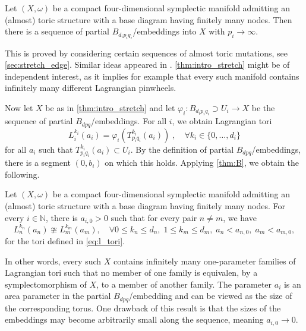 \documentclass[12pt,a4paper,abstract=true,final]{scrartcl}
\begin{document}
\begin{proposition}
    \label{thm:intro_stretch}
  Let $(X,\omega)$ be a compact four-dimensional symplectic manifold admitting an (almost) toric structure with a base diagram having finitely many nodes.
Then there is a sequence of partial $B_{d_i p_i q_i}$\-/embeddings into $X$ with $p_i \rightarrow \infty$. 
\end{proposition}

This is proved by considering certain sequences of almost toric mutations, see \cref{sec:stretch_edge}.
Similar ideas appeared in \cite{EvaUrz21}.
\cref{thm:intro_stretch} might be of independent interest, as it implies for example that every such manifold contains infinitely many different Lagrangian pinwheels. 

Now let $X$ be as in \cref{thm:intro_stretch} and let $\varphi_i \colon B_{d_i p_i q_i} \supset U_i \rightarrow X$ be the sequence of partial $B_{dpq}$\-/embeddings.
For all $i$, we obtain Lagrangian tori
\begin{equation}
    \label{eq:l_tori}
    L^{k_i}_i(a_i) = \varphi_i(T^{k_i}_{p_i q_i}(a_i))\;, \quad
    \forall k_i \in \{0,\ldots,d_i\}
\end{equation}
for all $a_i$ such that $T^{k_i}_{p_i q_i}(a_i) \subset U_i$.
By the definition of partial $B_{dpq}$\-/embeddings, there is a segment $(0,b_i)$ on which this holds.
Applying \cref{thm:B}, we obtain the following.
   

\begin{maintheorem}
    \label{thm:C}
    Let $(X,\omega)$ be a compact four-dimensional symplectic manifold admitting an (almost) toric structure with a base diagram having finitely many nodes.
For every $i \in \mathbb{N}$, there is $a_{i,0} > 0$ such that for every pair $n \neq m$, we have
    \begin{equation}
        L^{k_n}_n(a_n) \ncong L^{k_m}_m(a_m), \quad
        \forall 0 ≤ k_n ≤ d_n,\; 1 ≤ k_m ≤ d_m, \; a_n < a_{n,0}, \; a_m < a_{m,0},
    \end{equation}
    for the tori defined in \eqref{eq:l_tori}.
\end{maintheorem}

In other words, every such $X$ contains infinitely many one-parameter families of Lagrangian tori such that no member of one family is equivalen,  by a symplectomorphism of $X$, to a member of another family.
The parameter $a_i$ is an area parameter in the partial $B_{dpq}$\-/embedding and can be viewed as the size of the corresponding torus.
One drawback of this result is that the sizes of the embeddings may become arbitrarily small along the sequence, meaning $a_{i,0} \rightarrow 0$. 
\end{document}
